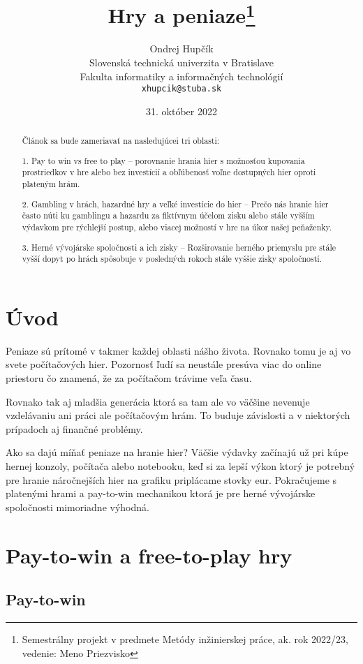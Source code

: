 \documentclass[10pt,twoside,slovak,a4paper]{article}
\title{Hry a peniaze\thanks{Semestrálny projekt v predmete Metódy inžinierskej práce, ak. rok 2022/23, vedenie: Meno Priezvisko}} %
\author{Ondrej Hupčík\\[2pt]
	{\small Slovenská technická univerzita v Bratislave}\\
	{\small Fakulta informatiky a informačných technológií}\\
	{\small \texttt{xhupcik@stuba.sk}}
	}
\date{\small 31. október 2022}
\begin{document}
\maketitle

\begin{abstract}

Článok sa bude zameriavať na nasledujúcei tri oblasti:
\item1.	Pay to win vs free to play – porovnanie hrania hier s možnosťou kupovania prostriedkov v hre alebo bez investícií a obľúbenosť voľne dostupných hier oproti plateným hrám.
\item2.	Gambling v hrách, hazardné hry a veľké investície do hier – Prečo nás hranie hier často núti ku gamblingu a hazardu za fiktívnym účelom zisku alebo stále vyšším výdavkom pre rýchlejší postup, alebo viacej možností v hre na úkor našej peňaženky.
\item3.	Herné vývojárske spoločnosti a ich zisky – Rozširovanie herného priemyslu pre stále vyšší dopyt po hrách spôsobuje v posledných rokoch stále vyššie zisky spoločností.

\end{abstract}


\section{Úvod}

Peniaze sú prítomé v takmer každej oblasti nášho života. Rovnako tomu je aj vo svete počítačových hier. Pozornosť ľudí sa neustále presúva viac do online priestoru čo znamená, že za počítačom trávime veľa času.

Rovnako tak aj mladšia generácia ktorá sa tam ale vo väčšine nevenuje vzdelávaniu ani práci ale počítačovým hrám. To buduje závislosti a v niektorých prípadoch aj finančné problémy. 

Ako sa dajú míňať peniaze na hranie hier? Väčšie výdavky začínajú už pri kúpe hernej konzoly, počítača alebo notebooku, keď si za lepší výkon ktorý je potrebný pre hranie náročnejších hier na grafiku priplácame stovky eur. Pokračujeme s platenými hrami a pay-to-win mechanikou ktorá je pre herné vývojárske spoločnosti mimoriadne výhodná.




\section{Pay-to-win a free-to-play hry} 

\subsection{Pay-to-win} 
\end{document}
